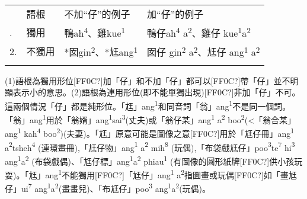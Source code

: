 \tabletail{}
\tablelasttail{}
\begin{tabularx}{\textwidth}{XXXX} & 語根 & 不加“仔”的例子 & 加“仔”的例子\\
\lsptoprule
1. & 獨用 & {\sffamily \textrm{鴨ah}\textrm{\textsuperscript{4}}\textrm{、雞kue}\textrm{\textsuperscript{1}}} & {\sffamily \textrm{鴨仔ah}\textrm{\textsuperscript{4}} \textrm{a}\textrm{\textsuperscript{2}}\textrm{、雞仔 kue}\textrm{\textsuperscript{1}}\textrm{a}\textrm{\textsuperscript{2}}}\\
2. & 不獨用 & {\sffamily \textrm{*囡gin}\textrm{\textsuperscript{2}}\textrm{、*尪ang}\textrm{\textsuperscript{1}}} & {\sffamily \textrm{囡仔 gin}\textrm{\textsuperscript{2}} \textrm{a}\textrm{\textsuperscript{2}}\textrm{、尪仔 ang}\textrm{\textsuperscript{1}} \textrm{a}\textrm{\textsuperscript{2}}}\\
\lspbottomrule
\end{tabularx}
\textrm{(1)語根為獨用形位[FF0C?]加「仔」和不加「仔」都可以[FF0C?]帶「仔」並不明顯表示小的意思。(2)語根為連用形位(即不能單獨出現)}[FF0C?]\textrm{非加「仔」不可。這兩個情況「仔」都是純形位。「尪」ang}\textrm{\textsuperscript{1}}\textrm{和同音詞「翁」ang}\textrm{\textsuperscript{1}}\textrm{不是同一個詞。「翁」ang}\textrm{\textsuperscript{1}}\textrm{用於「翁婿」ang}\textrm{\textsuperscript{1}}\textrm{sai}\textrm{\textsuperscript{3}}\textrm{(丈夫)或「翁仔某」ang}\textrm{\textsuperscript{1} }\textrm{a}\textrm{\textsuperscript{2}} \textrm{boo}\textrm{\textsuperscript{2}}\textrm{(<「翁合某」ang}\textrm{\textsuperscript{1}} \textrm{kah}\textrm{\textsuperscript{4}} \textrm{boo}\textrm{\textsuperscript{2}}\textrm{)(夫妻)}。\textrm{「尪」原意可能是圖像之意[FF0C?]用於「尪仔冊」ang}\textrm{\textsuperscript{1} }\textrm{a}\textrm{\textsuperscript{2}}\textrm{tsheh}\textrm{\textsuperscript{4}} \textrm{(連環畫冊)},\textrm{「尪仔物」ang}\textrm{\textsuperscript{1} }\textrm{a}\textrm{\textsuperscript{2} }\textrm{mih}\textrm{\textsuperscript{8}} \textrm{(玩偶),「布袋戲尪仔」poo}\textrm{\textsuperscript{3}}\textrm{te}\textrm{\textsuperscript{7}} \textrm{hi}\textrm{\textsuperscript{3}} \textrm{ang}\textrm{\textsuperscript{1}}\textrm{a}\textrm{\textsuperscript{2} }\textrm{(布袋戲偶)}、\textrm{「尪仔標」ang}\textrm{\textsuperscript{1}}\textrm{a}\textrm{\textsuperscript{2}} \textrm{phiau}\textrm{\textsuperscript{1}} \textrm{(有圖像的圓形紙牌[FF0C?]供小孩玩耍)}。\textrm{「尪」ang}\textrm{\textsuperscript{1}}\textrm{不能獨用[FF0C?]「尪仔」ang}\textrm{\textsuperscript{1} }\textrm{a}\textrm{\textsuperscript{2}}\textrm{指圖畫或玩偶[FF0C?]如「畫尪仔」ui}\textrm{\textsuperscript{7}} \textrm{ang}\textrm{\textsuperscript{1}}\textrm{a}\textrm{\textsuperscript{2}}\textrm{(畫畫兒)}、\textrm{「布尪仔」poo}\textrm{\textsuperscript{3}} \textrm{ang}\textrm{\textsuperscript{1}}\textrm{a}\textrm{\textsuperscript{2}}\textrm{(玩偶)}。

